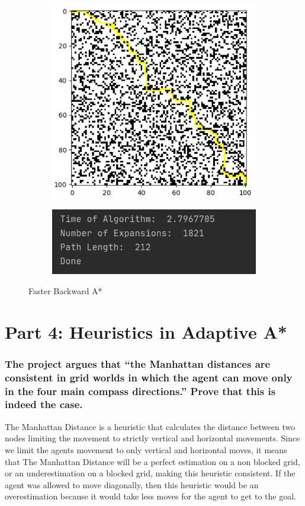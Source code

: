 \documentclass{article}
\begin{document}
\begin{figure}[h!]
\begin{subfigure}{.5\textwidth}
  \centering
  \includegraphics[width=.8\linewidth]{fastbackA.png}
  \label{fig:sfig1}
\end{subfigure}%
\begin{subfigure}{.5\textwidth}
  \centering
  \includegraphics[width=.8\linewidth]{fastbackAstats.png}
  \label{fig:sfig2}
\end{subfigure}
\caption{Faster Backward A*}
\end{figure}
\setcounter{figure}{0}


\newpage

\section*{Part 4: Heuristics in Adaptive A*}
\subsubsection*{The project argues that “the Manhattan distances are consistent in grid worlds in which the agent can move only in the four main compass directions.” Prove that this is indeed the case.}
The Manhattan Distance is a heuristic that calculates the distance between two nodes limiting the movement to strictly vertical and horizontal movements. Since we limit the agents movement to only vertical and horizontal moves, it means that The Manhattan Distance will be a perfect estimation on a non blocked grid, or an underestimation on a blocked grid, making this heuristic consistent. If the agent was allowed to move diagonally, then this heuristic would be an overestimation because it would take less moves for the agent to get to the goal.
\end{document}
